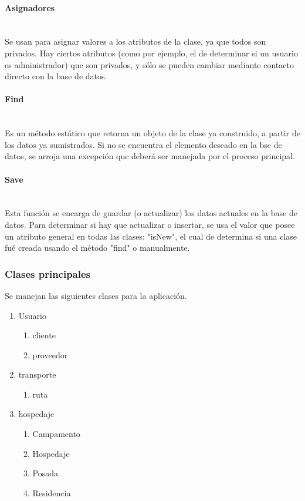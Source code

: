 \documentclass{article}
\begin{document}
        \paragraph{Asignadores}\mbox{}\\
        Se usan para asignar valores a los atributos de la clase, ya que todos son privados. Hay ciertos atributos (como por ejemplo, el de determinar si un usuario es administrador) que son privados, y sólo se pueden cambiar mediante contacto directo con la base de datos.
        \paragraph{Find}\mbox{}\\
        Es un método estático que retorna un objeto de la clase ya construido, a partir de los datos ya sumistrados. Si no se encuentra el elemento deseado en la bse de datos, se arroja una excepción que deberá ser manejada por el proceso principal.
        \paragraph{Save}\mbox{}\\
        Esta función se encarga de guardar (o actualizar) los datos actuales en la base de datos. Para determinar si hay que actualizar o insertar, se usa el valor que posee un atributo general en todas las clases: "isNew", el cual de determina si una clase fué creada usando el método "find" o manualmente.
        
    \subsubsection{Clases principales}
        Se manejan las siguientes clases para la aplicación.
        \begin{enumerate}
            \item Usuario
            \begin{enumerate}
                \item cliente
                \item proveedor
            \end{enumerate}
            \item transporte
            \begin{enumerate}
                \item ruta
            \end{enumerate}
            \item hospedaje
            \begin{enumerate}
                \item Campamento
                \item Hospedaje
                \item Posada
                \item Residencia
            \end{enumerate}
        \end{enumerate}
\end{document}
